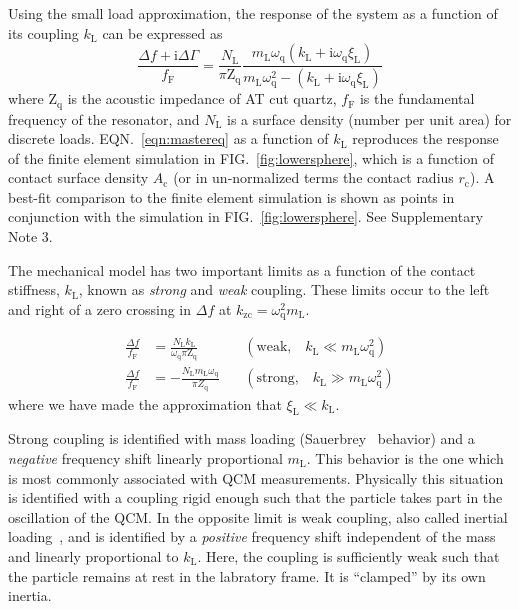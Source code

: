 \documentclass[floatfix,superscriptaddress,a4paper,twocolumn]{revtex4-1}
\newcommand{\Figure}[1]{FIG.~\ref{#1}}
\newcommand{\Equation}[1]{EQN.~\ref{#1}}
\newcommand{\mi}{{\mathrm{i}}}
\newcommand{\df}{\Delta\!f}
\newcommand{\dg}{\Delta\Gamma}
\newcommand{\xil}{\xi_\mathrm{L}}
\newcommand{\kl}{k_\mathrm{L}}
\newcommand{\ml}{m_\mathrm{L}}
\newcommand{\omegaq}{\omega_\mathrm{q}}
\begin{document}
Using the small load approximation, the response of the system as a
function of its coupling $\kl$ can be expressed
as~\cite{steinem2007piezoelectric}
\begin{equation}
\frac{\df + \mi \dg}{f_\mathrm{F}} = \frac{N_\mathrm{L}}{\pi
\mathrm{Z}_\mathrm{q}}
\frac{\ml \omegaq \left( \kl + \mi
\omegaq \xil\right) }
{\ml \omegaq^2 - \left(\kl + \mi
\omegaq \xil\right)}
\label{eqn:mastereq}
\end{equation}
where $\mathrm{Z}_\mathrm{q}$ is the acoustic impedance of AT cut quartz,
$f_\mathrm{F}$ is the fundamental frequency of the resonator, and
$N_\mathrm{L}$ is a surface density (number per unit area) for discrete
loads.  \Equation{eqn:mastereq} as a function of $\kl$ reproduces the
response of the finite element simulation in \Figure{fig:lowersphere},
which is a function of contact surface density $A_\mathrm{c}$ (or in
un-normalized terms the contact radius $r_\mathrm{c}$).  A best-fit comparison to 
the finite element simulation is shown as points in conjunction with the simulation
in \Figure{fig:lowersphere}.  See Supplementary Note 3.

The mechanical model has two important limits as a function of the contact
stiffness, $\kl$, known as \textit{strong} and \textit{weak}
coupling.  These limits occur to the left and right of a zero crossing in $\df$ at
$k_\mathrm{zc}=\omegaq^2 \ml$.

\vspace{-\baselineskip}
\vspace{-\parskip}
\begin{align}
\frac{\df}{f_\mathrm{F}}&= 
\frac{N_\mathrm{L} \kl}
{\omegaq\pi \mathrm{Z}_\mathrm{q}}
&\,&\left(\text{weak,}\quad \kl\ll \ml
\omegaq^2\right)
\label{eqn:couplinguy1}
\\
\frac{\df}{f_\mathrm{F}}&=  -\frac{N_\mathrm{L}
\ml \omegaq}{\pi Z_\mathrm{q}}
&\,&\left(\text{strong,}\quad \kl\gg \ml
\omegaq^2\right)
\label{eqn:couplinguy2}
\end{align}
where we have made the approximation that
$\xil\ll\kl$.~\cite{steinem2007piezoelectric}


Strong coupling is identified with mass loading
(Sauerbrey~\cite{sauerbrey1959verwendung} behavior) and a \textit{negative}
frequency shift linearly proportional $\ml$.  This behavior is the
one which is most commonly associated with QCM measurements.  Physically
this situation is identified with a coupling rigid enough such that
the particle takes part in the oscillation of the QCM.
In the
opposite limit is weak coupling, also called inertial
loading~\cite{dybwad1985sensitive}, and is identified by a \textit{positive}
frequency shift independent of the mass and linearly proportional
to $\kl$.  Here, the coupling is sufficiently weak such that the particle
remains at rest in the labratory frame.  It is ``clamped'' by its own
inertia.~\cite{du2008role}
\end{document}
